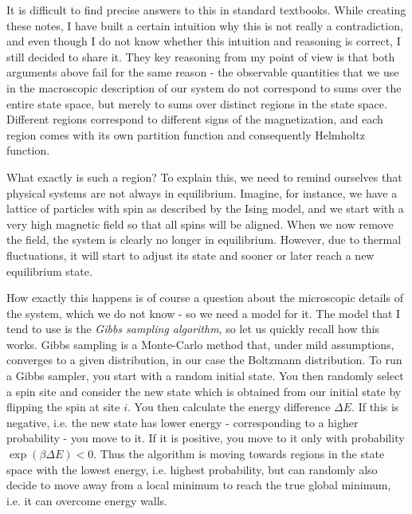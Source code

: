 \documentclass[a4paper, draft]{article}
\theoremstyle{own}
\theoremstyle{remark}
\begin{document}
It is difficult to find precise answers to this in standard textbooks. While creating these notes, I have built a certain intuition why this is not really a contradiction, and even though I do not know whether this intuition and reasoning is correct, I still decided to share it. They key reasoning from my point of view is that both arguments above fail for the same reason - the observable quantities that we use in the macroscopic description of our system do not correspond to sums over the entire state space, but merely to sums over distinct regions in the state space. Different regions correspond to different signs of the magnetization, and each region comes with its own partition function and consequently Helmholtz function. 

What exactly is such a region? To explain this, we need to remind ourselves that physical systems are not always in equilibrium. Imagine, for instance, we have a lattice of particles with spin as described by the Ising model, and we start with a very high magnetic field so that all spins will be aligned. When we now remove the field, the system is clearly no longer in equilibrium. However, due to thermal fluctuations, it will start to adjust its state and sooner or later reach a new equilibrium state. 

How exactly this happens is of course a question about the microscopic details of the system, which we do not know - so we need a model for it. The model that I tend to use is the {\em Gibbs sampling algorithm}, so let us quickly recall how this works. Gibbs sampling is a Monte-Carlo method that, under mild assumptions, converges to a given distribution, in our case the Boltzmann distribution. To run a Gibbs sampler, you start with a random initial state. You then randomly select a spin site and consider the new state which is obtained from our initial state by flipping the spin at site $i$. You then calculate the energy difference $\Delta E$. If this is negative, i.e. the new state has lower energy - corresponding to a higher probability - you move to it. If it is positive, you move to it only with probability $\exp(\beta \Delta E) < 0$. Thus the algorithm is moving towards regions in the state space with the lowest energy, i.e. highest probability, but can randomly also decide to move away from a local minimum to reach the true global minimum, i.e. it can overcome energy walls. 
\end{document}
